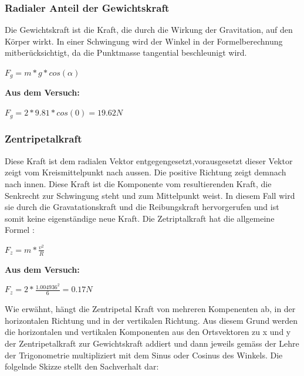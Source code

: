 \documentclass[../main.tex]{subfiles}
\begin{document}
\subsubsection{Radialer Anteil der Gewichtskraft}
Die Gewichtskraft ist die Kraft, die durch die Wirkung der Gravitation, auf den Körper wirkt. In einer Schwingung wird der Winkel in der Formelberechnung mitberücksichtigt, da die Punktmasse tangential beschleunigt wird.\cite{tiplerpaula.PhysikFurStudierende}
\begin{mdframed}
$F_g = m * g * cos(\alpha)$
\end{mdframed}
\textbf {Aus dem Versuch:}
\begin{mdframed}
$F_g = 2 * 9.81 * cos(0) = 19.62N$
\end{mdframed}
\subsubsection{Zentripetalkraft}
Diese Kraft ist dem radialen Vektor entgegengesetzt,vorausgesetzt dieser Vektor zeigt vom Kreismittelpunkt nach aussen. Die positive Richtung zeigt demnach nach innen. Diese Kraft ist die Komponente vom resultierenden Kraft, die Senkrecht zur Schwingung steht und zum Mittelpunkt weist. In diesem Fall wird sie durch die Gravatationskraft und die Reibungskraft hervorgerufen und ist somit keine eigenständige neue Kraft.
Die Zetriptalkraft hat die allgemeine Formel \cite{tiplerpaula.PhysikFurStudierende}:
\begin{mdframed}
$F_z=m * \frac{v^2}{R} $
\end{mdframed}
\textbf {Aus dem Versuch:}
\begin{mdframed}
$F_z = 2 * \frac{1.004936^2}{6} = 0.17N$
\end{mdframed}
Wie erwähnt, hängt die Zentripetal Kraft von mehreren Kompenenten ab, in der horizontalen Richtung und in der vertikalen Richtung. Aus diesem Grund werden die horizontalen und vertikalen Komponenten aus den Ortsvektoren zu x und y der Zentripetalkraft zur Gewichtskraft addiert und dann jeweils gemäss der Lehre der Trigonometrie multipliziert mit dem Sinus oder Cosinus des Winkels. Die folgelnde Skizze stellt den Sachverhalt dar:
\end{document}
